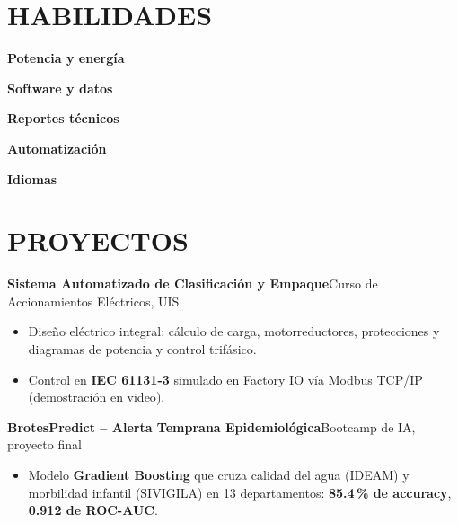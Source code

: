 \documentclass[10pt,a4paper]{article}
\newcommand{\entrada}[3]{%
    \noindent\textbf{#1}\hfill{\small\color{secundario}#2}\\[-1pt]
    {\small\color{secundario}#3}\par\vspace{2pt}%
}
\newcommand{\fila}[2]{%
    \noindent\textbf{\small\color{primario}#1}\hspace{6pt}{\small #2}\par\vspace{2.5pt}%
}
\begin{document}
\section*{HABILIDADES}
\fila{Potencia y energía}{Hosting Capacity, redes de distribución, sistemas fotovoltaicos, protecciones, mercados de energía, puestas a tierra}
\fila{Software y datos}{Python (NumPy, Seaborn), Rust (sistemas embebidos, en aprendizaje), OpenDSS, Scikit-learn, bases de datos relacionales, KiCad, Git, Linux y Bash, métodos numéricos}
\fila{Reportes técnicos}{Generación automatizada de reportes y presentaciones con Python y LaTeX, con gráficas de calidad profesional}
\fila{Automatización}{IEC 61131-3 (Ladder/FBD, GRAFCET), OpenPLC, Modbus TCP/IP}
\fila{Idiomas}{Español nativo \quad$\cdot$\quad Inglés en proceso de certificación (Altissia, UIS)}

\section*{PROYECTOS}

\entrada{Sistema Automatizado de Clasificación y Empaque}{Curso de Accionamientos Eléctricos, UIS}{}
\vspace{-6pt}
\begin{itemize}
    \item Diseño eléctrico integral: cálculo de carga, motorreductores, protecciones y diagramas de potencia y control trifásico.
    \item Control en \textbf{IEC 61131-3} simulado en Factory IO vía Modbus TCP/IP (\href{https://youtube.com/playlist?list=PLUTAdDOdTlkNAtmTmna0_Z4TgAq-pZNoZ&si=ZV5tGop65upxRSAQ}{demostración en video}).
\end{itemize}
\vspace{4pt}

\entrada{BrotesPredict -- Alerta Temprana Epidemiológica}{Bootcamp de IA, proyecto final}{}
\vspace{-6pt}
\begin{itemize}
    \item Modelo \textbf{Gradient Boosting} que cruza calidad del agua (IDEAM) y morbilidad infantil (SIVIGILA) en 13 departamentos: \textbf{85.4\,\% de accuracy}, \textbf{0.912 de ROC-AUC}.
\end{itemize}
\vspace{4pt}
\end{document}

